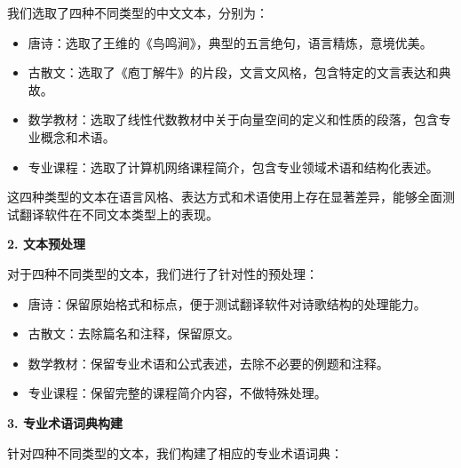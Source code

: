 \documentclass[bwprint]{cumcmthesis}
\begin{document}
我们选取了四种不同类型的中文文本，分别为：
\begin{itemize}
    \item 唐诗：选取了王维的《鸟鸣涧》，典型的五言绝句，语言精炼，意境优美。
    \item 古散文：选取了《庖丁解牛》的片段，文言文风格，包含特定的文言表达和典故。
    \item 数学教材：选取了线性代数教材中关于向量空间的定义和性质的段落，包含专业概念和术语。
    \item 专业课程：选取了计算机网络课程简介，包含专业领域术语和结构化表述。
\end{itemize}

这四种类型的文本在语言风格、表达方式和术语使用上存在显著差异，能够全面测试翻译软件在不同文本类型上的表现。
    
\textbf{2. 文本预处理}
    
对于四种不同类型的文本，我们进行了针对性的预处理：
\begin{itemize}
    \item 唐诗：保留原始格式和标点，便于测试翻译软件对诗歌结构的处理能力。
    \item 古散文：去除篇名和注释，保留原文。
    \item 数学教材：保留专业术语和公式表述，去除不必要的例题和注释。
    \item 专业课程：保留完整的课程简介内容，不做特殊处理。
\end{itemize}

\textbf{3. 专业术语词典构建}
    
针对四种不同类型的文本，我们构建了相应的专业术语词典：
\end{document}
